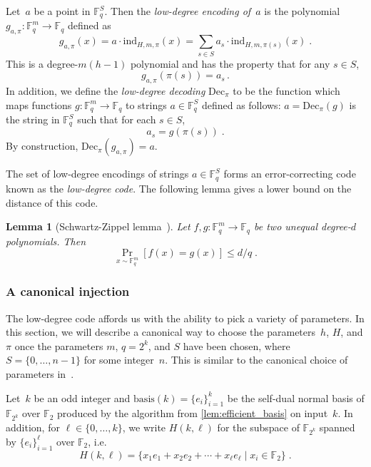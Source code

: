 \documentclass[11pt]{article}
\newtheorem{lemma}[theorem]{Lemma}
\theoremstyle{definition}
\newcommand{\F}{\ensuremath{\mathbb{F}}}
\newcommand{\ind}{\ensuremath{\textrm{ind}}}
\newcommand{\coded}{\mathrm{Dec}}
\newcommand{\canbasis}[1]{\mathrm{basis}(#1)}
\begin{document}
Let~$a$ be a point in $\F_q^S$.
Then the \emph{low-degree encoding of~$a$} is the polynomial $g_{a, \pi}:\F_q^m
\to \F_q$ defined as
\begin{equation}\label{eq:low-degree-encoding-definition}
  g_{a, \pi}(x) = a\cdot \ind_{H,m, \pi}(x) = \sum_{s \in S} a_s
  \cdot \ind_{H, m,\pi(s)}(x)\;.
\end{equation}
This is a degree-$m (h-1)$ polynomial and has the property that for any $s \in
S$, \[ g_{a, \pi}(\pi(s)) = a_s \,.\] In addition, we define the
\emph{low-degree decoding} $\coded_{\pi}$ to be the function which maps
functions $g:\F_{q}^m \to \F_q$ to strings $a \in \F_q^S$ defined as follows: $a
= \coded_{\pi}(g)$ is the string in $\F_q^S$ such that for each $s \in S$,
\begin{equation*}
a_s = g(\pi(s))\;.
\end{equation*}
By construction, $\coded_{\pi}(g_{a, \pi}) = a$.

The set of low-degree encodings of strings $a \in \F_q^S$ forms an
error-correcting code known as the \emph{low-degree code}.
The following lemma gives a lower bound on the distance of this code.

\begin{lemma}[Schwartz-Zippel lemma~\cite{Sch80,Zip79}]
  \label{lem:schwartz-zippel}
  Let $f, g: \F_q^m \to \F_q$ be two unequal degree-$d$ polynomials. Then
  \begin{equation*}
    \Pr_{x \sim \F_q^m}[f(x) = g(x)] \leq d/q\;.
  \end{equation*}
\end{lemma}

\subsubsection{A canonical injection}
\label{sec:canonical-injection}

The low-degree code affords us with the ability to pick a variety of parameters.
In this section,
we will describe a canonical way to choose the parameters~$h$, $H$, and $\pi$
once the parameters $m$, $q=2^k$, and $S$ have been chosen,
where $S = \{0, \ldots, n-1\}$ for some integer~$n$.
This is similar to the canonical choice of parameters in~\cite[Section~$3.4$]{NW19}.


Let~$k$ be an odd integer and $\canbasis{k} = \{e_i\}_{i=1}^k$ be the self-dual
normal basis of $\F_{2^k}$ over $\F_2$ produced by the algorithm from
\cref{lem:efficient_basis} on input~$k$.
In addition, for $\ell \in \{0, \ldots, k\}$, we write $H(k, \ell)$ for the
subspace of $\F_{2^k}$ spanned by $\{e_i\}_{i=1}^\ell$ over $\F_2$, i.e.\
\begin{equation*}
  H(k, \ell) = \big\{x_1 e_1 + x_2 e_2 + \cdots +
  x_{\ell} e_{\ell} \mid x_i \in \F_{2}\big\}\;.
\end{equation*}
\end{document}
